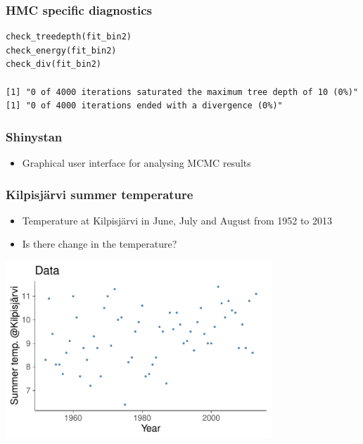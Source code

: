 \documentclass[10pt]{beamer}
\begin{document}
\begin{frame}[fragile]

\frametitle{HMC specific diagnostics}

  {\scriptsize
\begin{lstlisting}
check_treedepth(fit_bin2)
check_energy(fit_bin2)
check_div(fit_bin2)

[1] "0 of 4000 iterations saturated the maximum tree depth of 10 (0%)"
[1] "0 of 4000 iterations ended with a divergence (0%)"
\end{lstlisting}
  }

\end{frame}

\begin{frame}[fragile]

\frametitle{Shinystan}

  \begin{itemize}
  \item Graphical user interface for analysing MCMC results
  \end{itemize}

\end{frame}

\begin{frame}

\frametitle{Kilpisjärvi summer temperature}

  \begin{itemize}
  \item Temperature at Kilpisjärvi in June, July and August from 1952 to 2013
  \item Is there change in the temperature?
  \end{itemize}
  \begin{center}
    \includegraphics[width=10cm]{figs/kilpis_data.pdf}
  \end{center}

\end{frame}
\end{document}
